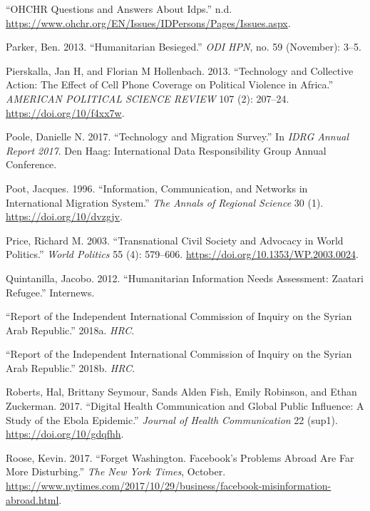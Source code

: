 \begin{cslreferences}
\leavevmode\hypertarget{ref-OHCHR}{}%
``OHCHR Questions and Answers About Idps.'' n.d.
\url{https://www.ohchr.org/EN/Issues/IDPersons/Pages/Issues.aspx}.

\leavevmode\hypertarget{ref-Parker2013Humanitarian}{}%
Parker, Ben. 2013. ``Humanitarian Besieged.'' \emph{ODI HPN}, no. 59
(November): 3--5.

\leavevmode\hypertarget{ref-Pierskalla2013Technology}{}%
Pierskalla, Jan H, and Florian M Hollenbach. 2013. ``Technology and
Collective Action: The Effect of Cell Phone Coverage on Political
Violence in Africa.'' \emph{AMERICAN POLITICAL SCIENCE REVIEW} 107 (2):
207--24. \url{https://doi.org/10/f4xx7w}.

\leavevmode\hypertarget{ref-Poole2017Technology}{}%
Poole, Danielle N. 2017. ``Technology and Migration Survey.'' In
\emph{IDRG Annual Report 2017}. Den Haag: International Data
Responsibility Group Annual Conference.

\leavevmode\hypertarget{ref-Poot1996Information}{}%
Poot, Jacques. 1996. ``Information, Communication, and Networks in
International Migration System.'' \emph{The Annals of Regional Science}
30 (1). \url{https://doi.org/10/dvzgjv}.

\leavevmode\hypertarget{ref-Price2003Transnational}{}%
Price, Richard M. 2003. ``Transnational Civil Society and Advocacy in
World Politics.'' \emph{World Politics} 55 (4): 579--606.
\url{https://doi.org/10.1353/WP.2003.0024}.

\leavevmode\hypertarget{ref-Quintanilla2012Humanitarian}{}%
Quintanilla, Jacobo. 2012. ``Humanitarian Information Needs Assessment:
Zaatari Refugee.'' Internews.

\leavevmode\hypertarget{ref-Feb2018Report}{}%
``Report of the Independent International Commission of Inquiry on the
Syrian Arab Republic.'' 2018a. \emph{HRC}.

\leavevmode\hypertarget{ref-August2018Report}{}%
``Report of the Independent International Commission of Inquiry on the
Syrian Arab Republic.'' 2018b. \emph{HRC}.

\leavevmode\hypertarget{ref-Roberts2017Digital}{}%
Roberts, Hal, Brittany Seymour, Sands Alden Fish, Emily Robinson, and
Ethan Zuckerman. 2017. ``Digital Health Communication and Global Public
Influence: A Study of the Ebola Epidemic.'' \emph{Journal of Health
Communication} 22 (sup1). \url{https://doi.org/10/gdqfhh}.

\leavevmode\hypertarget{ref-Roose2017Forget}{}%
Roose, Kevin. 2017. ``Forget Washington. Facebook's Problems Abroad Are
Far More Disturbing.'' \emph{The New York Times}, October.
\url{https://www.nytimes.com/2017/10/29/business/facebook-misinformation-abroad.html}.


\end{cslreferences}
